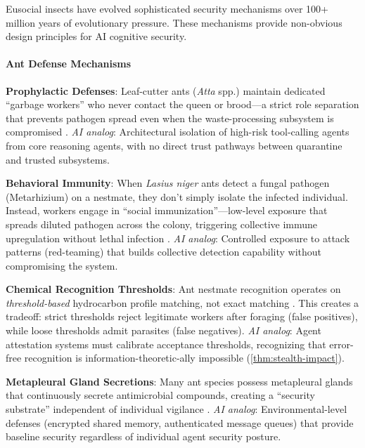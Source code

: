 \documentclass[
]{article}
\begin{document}
Eusocial insects have evolved sophisticated security mechanisms over
100+ million years of evolutionary pressure. These mechanisms provide
non-obvious design principles for AI cognitive security.

\paragraph{Ant Defense Mechanisms}\label{sec:ant-defenses}

\textbf{Prophylactic Defenses}: Leaf-cutter ants (\emph{Atta} spp.)
maintain dedicated ``garbage workers'' who never contact the queen or
brood---a strict role separation that prevents pathogen spread even when
the waste-processing subsystem is compromised
\citep{currie2006coevolved}. \emph{AI analog}: Architectural isolation
of high-risk tool-calling agents from core reasoning agents, with no
direct trust pathways between quarantine and trusted subsystems.

\textbf{Behavioral Immunity}: When \emph{Lasius niger} ants detect a
fungal pathogen (Metarhizium) on a nestmate, they don't simply isolate
the infected individual. Instead, workers engage in ``social
immunization''---low-level exposure that spreads diluted pathogen across
the colony, triggering collective immune upregulation without lethal
infection \citep{konrad2012social}. \emph{AI analog}: Controlled
exposure to attack patterns (red-teaming) that builds collective
detection capability without compromising the system.

\textbf{Chemical Recognition Thresholds}: Ant nestmate recognition
operates on \emph{threshold-based} hydrocarbon profile matching, not
exact matching \citep{lenoir2001chemical}. This creates a tradeoff:
strict thresholds reject legitimate workers after foraging (false
positives), while loose thresholds admit parasites (false negatives).
\emph{AI analog}: Agent attestation systems must calibrate acceptance
thresholds, recognizing that error-free recognition is
information-theoretic-ally impossible (\cref{thm:stealth-impact}).

\textbf{Metapleural Gland Secretions}: Many ant species possess
metapleural glands that continuously secrete antimicrobial compounds,
creating a ``security substrate'' independent of individual vigilance
\citep{fernandez2006evolution}. \emph{AI analog}: Environmental-level
defenses (encrypted shared memory, authenticated message queues) that
provide baseline security regardless of individual agent security
posture.
\end{document}
